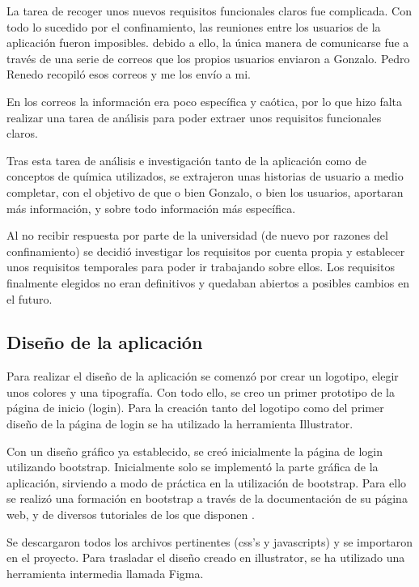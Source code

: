 La tarea de recoger unos nuevos requisitos funcionales claros fue complicada. Con todo lo sucedido por el confinamiento, las reuniones entre los usuarios de la aplicación fueron imposibles. debido a ello, la única manera de comunicarse fue a través de una serie de correos que los propios usuarios enviaron a Gonzalo. Pedro Renedo recopiló esos correos y me los envío a mi.

En los correos la información era poco específica y caótica, por lo que hizo falta realizar una tarea de análisis para poder extraer unos requisitos funcionales claros. 

Tras esta tarea de análisis e investigación tanto de la aplicación como de conceptos de química utilizados, se extrajeron unas historias de usuario a medio completar, con el objetivo de que o bien Gonzalo, o bien los usuarios, aportaran más información, y sobre todo información más específica. 

Al no recibir respuesta por parte de la universidad (de nuevo por razones del confinamiento) se decidió investigar los requisitos por cuenta propia y establecer unos requisitos temporales para poder ir trabajando sobre ellos. Los requisitos finalmente elegidos no eran definitivos y quedaban abiertos a posibles cambios en el futuro.


\subsection{Diseño de la aplicación}

Para realizar el diseño de la aplicación se comenzó por crear un logotipo, elegir unos colores y una tipografía. Con todo ello, se creo un primer prototipo de la página de inicio (login). Para la creación tanto del logotipo como del primer diseño de la página de login se ha utilizado la herramienta Illustrator. 

Con un diseño gráfico ya establecido, se creó inicialmente la página de login utilizando bootstrap. Inicialmente solo se implementó la parte gráfica de la aplicación, sirviendo a modo de práctica en la utilización de bootstrap. Para ello se realizó una formación en bootstrap a través de la documentación de su página web, y de diversos tutoriales de los que disponen \cite{doc:Bootstrap4}.

Se descargaron todos los archivos pertinentes (css's y javascripts) y se importaron en el proyecto. Para trasladar el diseño creado en illustrator, se ha utilizado una herramienta intermedia llamada Figma.

